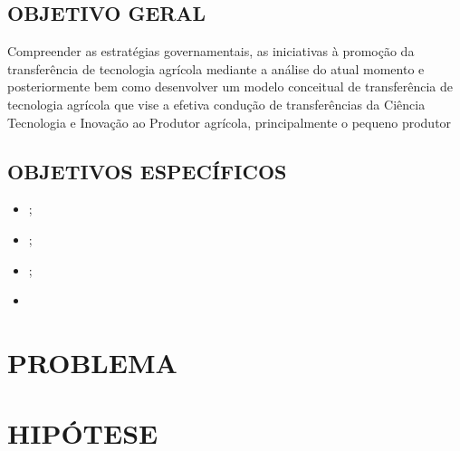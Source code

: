 \subsection{OBJETIVO GERAL}

Compreender as estratégias governamentais, as iniciativas à promoção da transferência de tecnologia agrícola mediante a análise do atual momento e posteriormente bem como desenvolver um modelo conceitual de transferência de tecnologia agrícola que vise a efetiva condução de transferências da Ciência Tecnologia e Inovação ao Produtor agrícola, principalmente o pequeno produtor
\subsection{OBJETIVOS ESPECÍFICOS}

\begin{itemize}
\item{;}
\item {;}
\item {;}
\item {}
\end{itemize}

\section{PROBLEMA}


\section{HIPÓTESE}




